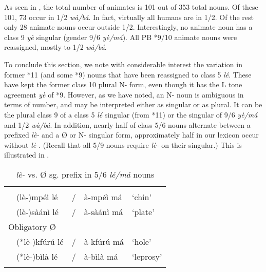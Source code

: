 \documentclass[output=paper,,modfonts,nonflat]{langsci/langscibook}
\begin{document}
As seen in , the total number of animates is 101 out of 353 total nouns. Of these 101, 73 occur in 1/2 \textit{wà/bá}. In fact, virtually all humans are in 1/2. Of the rest only 28 animate nouns occur outside 1/2. Interestingly, no animate noun has a class 9 \textit{yè} singular (gender 9/6 \textit{yè/má}). All PB *9/10 animate nouns were reassigned, mostly to 1/2 \textit{wà/bá}.

To conclude this section, we note with considerable interest the variation in former *11 (and some *9) nouns that have been reassigned to class 5 \textit{lé}. These have kept the former class 10 plural N- form, even though it has the L tone agreement \textit{yè} of *9. However, as we have noted, an N- noun is ambiguous in terms of number, and may be interpreted either as singular or as plural. It can be the plural class 9 of a class 5 \textit{lé} singular (from *11) or the singular of 9/6 \textit{yè/má} and 1/2 \textit{wà/bá}. In addition, nearly half of class 5/6 nouns alternate between a prefixed \textit{lè-} and a Ø or N- singular form, approximately half in our lexicon occur without \textit{lè-}. (Recall that all 5/9 nouns require \textit{lè-} on their singular.) This is illustrated in .


\begin{table}[!htbp]
\caption{\textit{lè-} vs. Ø sg. prefix in 5/6 \textit{lé/má} nouns}
\label{table16}
\begin{small}
\begin{tabular}[t]{l		l		l		l		l}
\lsptoprule	
\multicolumn{5}{l}{Optional Ø}							\\
	&	(lè-)mpéì lé	&	/	&	à-mpéì má	&	‘chin’	\\
	&	(lè-)sàánì lé	&	/	&	à-sàánì má	&	‘plate’	\\[0.2cm]
\multicolumn{5}{l}{Obligatory Ø}							\\
	&	(*lè-)kfúrú lé	&	/	&	à-kfúrú má	&	‘hole’	\\
	&	(*lè-)bìlà lé	&	/	&	à-bìlà má	&	‘leprosy’	\\
\lspbottomrule
\end{tabular}
\end{small}
\end{table}
\end{document}
